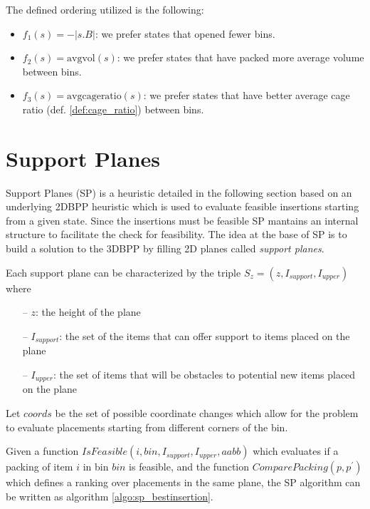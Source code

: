 The defined ordering utilized is the following:
\begin{itemize}
    \item $f_1(s) = -|s.B|$: we prefer states that opened fewer bins.
    \item $f_2(s) = \text{avgvol}(s)$: we prefer states that have packed more average volume between bins.
    \item $f_3(s) = \text{avgcageratio}(s)$: we prefer states that have better average cage ratio (def. \ref{def:cage_ratio}) between bins.
\end{itemize}

\section{Support Planes}
\label{sec:support_planes}%
Support Planes (SP) is a heuristic detailed in the following section based on an underlying 2DBPP heuristic which is used to evaluate feasible insertions starting from a given state.
Since the insertions must be feasible SP mantains an internal structure to facilitate the check for feasibility.
The idea at the base of SP is to build a solution to the 3DBPP by filling 2D planes called \textit{support planes}.

Each support plane can be characterized by the triple $S_z = (z, I_{support}, I_{upper})$ where
\begin{itemize}
    \item[--] $z$: the height of the plane 
    \item[--] $I_{support}$: the set of the items that can offer support to items placed on the plane
    \item[--] $I_{upper}$: the set of items that will be obstacles to potential new items placed on the plane %
\end{itemize}%

Let $coords$ be the set of possible coordinate changes which allow for the problem to evaluate placements starting from different corners of the bin. %

Given a function $IsFeasible(i, bin, I_{support}, I_{upper}, aabb)$ which evaluates if a packing of item $i$ in bin $bin$ is feasible,
and the function $ComparePacking(p, p^\prime)$ which defines a ranking over placements in the same plane,
the SP algorithm can be written as algorithm \ref{algo:sp_bestinsertion}.

